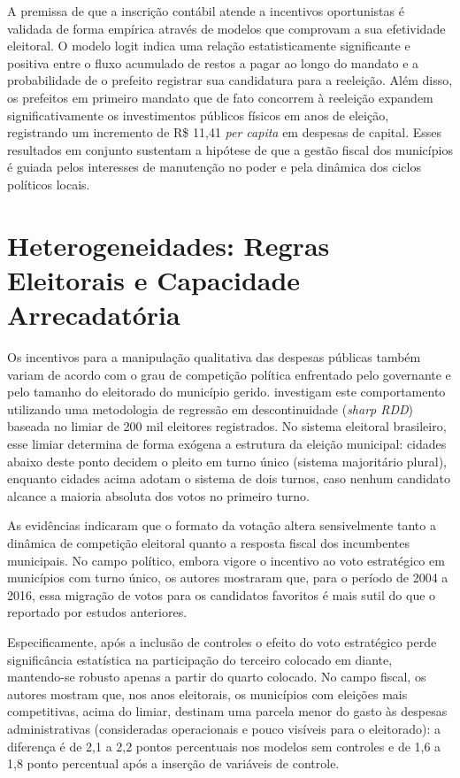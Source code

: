 A premissa de que a inscrição contábil atende a incentivos oportunistas é validada de forma empírica através de modelos que comprovam a sua efetividade eleitoral. O modelo logit indica uma relação estatisticamente significante e positiva entre o fluxo acumulado de restos a pagar ao longo do mandato e a probabilidade de o prefeito registrar sua candidatura para a reeleição. Além disso, os prefeitos em primeiro mandato que de fato concorrem à reeleição expandem significativamente os investimentos públicos físicos em anos de eleição, registrando um incremento de R\$ 11,41 \textit{per capita} em despesas de capital. Esses resultados em conjunto sustentam a hipótese de que a gestão fiscal dos municípios é guiada pelos interesses de manutenção no poder e pela dinâmica dos ciclos políticos locais.

\section{Heterogeneidades: Regras Eleitorais e Capacidade Arrecadatória}

Os incentivos para a manipulação qualitativa das despesas públicas também variam de acordo com o grau de competição política enfrentado pelo governante e pelo tamanho do eleitorado do município gerido. \textcite{teixeira2021} investigam este comportamento utilizando uma metodologia de regressão em descontinuidade (\textit{sharp RDD}) baseada no limiar de 200 mil eleitores registrados. No sistema eleitoral brasileiro, esse limiar determina de forma exógena a estrutura da eleição municipal: cidades abaixo deste ponto decidem o pleito em turno único (sistema majoritário plural), enquanto cidades acima adotam o sistema de dois turnos, caso nenhum candidato alcance a maioria absoluta dos votos no primeiro turno.

As evidências indicaram que o formato da votação altera sensivelmente tanto a dinâmica de competição eleitoral quanto a resposta fiscal dos incumbentes municipais. No campo político, embora vigore o incentivo ao voto estratégico em municípios com turno único, os autores mostraram que, para o período de 2004 a 2016, essa migração de votos para os candidatos favoritos é mais sutil do que o reportado por estudos anteriores.

Especificamente, após a inclusão de controles o efeito do voto estratégico perde significância estatística na participação do terceiro colocado em diante, mantendo-se robusto apenas a partir do quarto colocado. No campo fiscal, os autores mostram que, nos anos eleitorais, os municípios com eleições mais competitivas, acima do limiar, destinam uma parcela menor do gasto às despesas administrativas (consideradas operacionais e pouco visíveis para o eleitorado): a diferença é de 2,1 a 2,2 pontos percentuais nos modelos sem controles e de 1,6 a 1,8 ponto percentual após a inserção de variáveis de controle.

